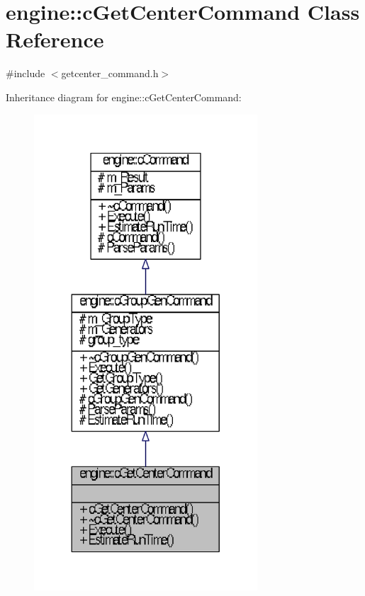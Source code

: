 \hypertarget{classengine_1_1cGetCenterCommand}{\section{engine\-:\-:c\-Get\-Center\-Command \-Class \-Reference}
\label{classengine_1_1cGetCenterCommand}
}


{\ttfamily \#include $<$getcenter\-\_\-command.\-h$>$}



\-Inheritance diagram for engine\-:\-:c\-Get\-Center\-Command\-:\nopagebreak
\begin{figure}[H]
\begin{center}
\leavevmode
\includegraphics[width=236pt]{classengine_1_1cGetCenterCommand__inherit__graph}
\end{center}
\end{figure}


